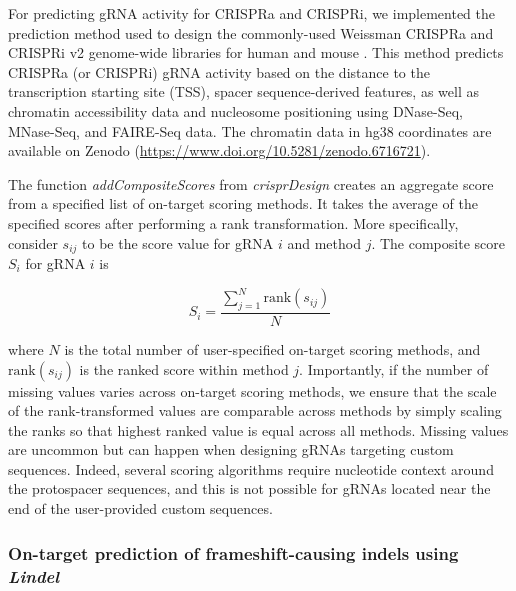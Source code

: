 \documentclass[pdftex,english,10pt]{article}
\begin{document}
For predicting gRNA activity for CRISPRa and CRISPRi, we implemented the prediction method used to design the commonly-used Weissman CRISPRa and CRISPRi v2 genome-wide libraries for human and mouse \citep{crispria}.
This method predicts CRISPRa (or CRISPRi) gRNA activity based on the distance to the transcription starting site (TSS), spacer sequence-derived features, as well as chromatin accessibility data and nucleosome positioning using DNase-Seq, MNase-Seq, and FAIRE-Seq data. The chromatin data in hg38 coordinates are available on Zenodo (\url{https://www.doi.org/10.5281/zenodo.6716721}).

The function \textit{addCompositeScores} from \textit{crisprDesign} creates an aggregate score from a specified list of on-target scoring methods. It takes the average of the specified scores after performing a rank transformation. More specifically, consider $s_{ij}$ to be the score value for gRNA $i$ and method $j$. The composite score $S_{i}$ for gRNA $i$ is

\begin{equation}
S_{i} = \frac{\sum_{j = 1}^N \text{rank}(s_{ij})}{N}
\end{equation}

where $N$ is the total number of user-specified on-target scoring methods, and $\text{rank}(s_{ij})$ is the ranked score within method $j$. Importantly, if the number of missing values varies across on-target scoring methods, we ensure that the scale of the rank-transformed values are comparable across methods by simply scaling the ranks so that highest ranked value is equal across all methods. Missing values are uncommon but can happen when designing gRNAs targeting custom sequences. Indeed, several scoring algorithms require nucleotide context around the protospacer sequences, and this is not possible for gRNAs located near the end of the user-provided custom sequences. 


\subsubsection*{On-target prediction of frameshift-causing indels using \textit{Lindel}}
\end{document}
